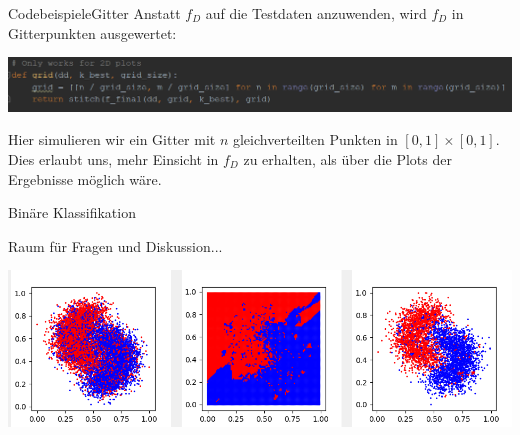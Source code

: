\documentclass[9pt]{beamer}
\begin{document}
\begin{frame}{Codebeispiele}{Gitter}
Anstatt $f_D$ auf die Testdaten anzuwenden, wird $f_D$ in Gitterpunkten ausgewertet: 
\begin{center}
\includegraphics[scale=0.5]{assets/grid.png}
\end{center}
Hier simulieren wir ein Gitter mit $n$ gleichverteilten Punkten in $[0, 1] \times [0, 1]$.\\[0.4em]
Dies erlaubt uns, mehr Einsicht in $f_D$ zu erhalten, als über die Plots der Ergebnisse möglich wäre.
\end{frame}

\begin{frame}{Binäre Klassifikation}
\begin{huge}
Raum für Fragen und Diskussion...
\end{huge}
\begin{center}
\includegraphics[scale=0.5]{assets/bananas-2-2d-lowk.png}
\end{center}
\end{frame}
\end{document}

